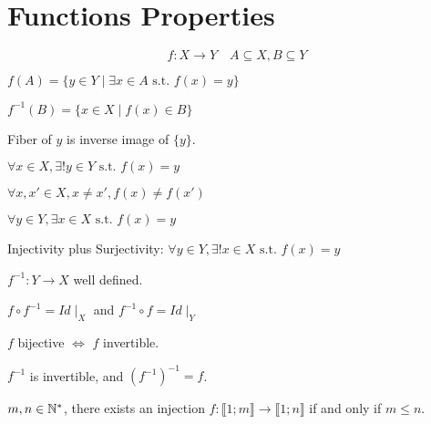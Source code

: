 \chapter{Functions Properties}
$$f: X \to Y \quad A \subseteq X, B \subseteq Y$$
\begin{definition}[Image]
	$f(A) = \{ y \in Y \mid \exists x \in A \text{ s.t. } f(x)=y \}$
\end{definition}
\begin{definition}
	$f^{-1}(B) = \{ x \in X \mid f(x) \in B \}$
\end{definition}
\begin{definition}[Fiber]
	Fiber of $y$ is inverse image of $\{y\}$.
\end{definition}
\begin{definition}
	$\forall x \in X, \exists ! y \in Y \text{ s.t. } f(x) = y$\\
\end{definition}
\begin{definition}[Injectivity]
	$\forall x,x' \in X, x \neq x', f(x) \neq f(x')$
\end{definition}
\begin{definition}[Surjectivity]
	$\forall y \in Y, \exists x \in X \text{ s.t. } f(x) = y$
\end{definition}
\begin{definition}[Bijectivity]
	Injectivity plus Surjectivity:
	$\forall y \in Y, \exists! x \in X \text{ s.t. } f(x) = y$
\end{definition}
\begin{definition}[Invertibility]
	$f^{-1}: Y \to X$ well defined.
\end{definition}
\begin{remark}
	$f \circ f^{-1} = Id \mid_X$  and $f^{-1} \circ f = Id \mid_Y$
\end{remark}
\begin{remark}
	$f$ bijective $\iff$ $f$ invertible.
\end{remark}
\begin{remark}
	$f^{-1}$ is invertible, and $(f^{-1})^{-1}=f$.
\end{remark}
\begin{property}
	$m,n \in \mathbb{N}^*$, there exists an injection $f:\llbracket 1;m \rrbracket \rightarrow \llbracket 1;n \rrbracket$ if and only if $m \leq n$.
\end{property}
